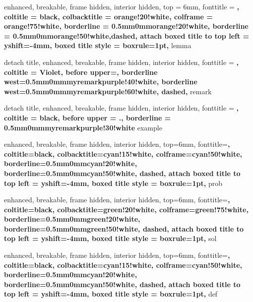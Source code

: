 {%
	enhanced,
	breakable,
	frame hidden,
	interior hidden,
	top = 6mm,
	fonttitle = \bfseries,
	coltitle = black,
	colbacktitle = orange!20!white,
	colframe = orange!75!white,
	borderline = {0.5mm}{0mm}{orange!20!white},
	borderline = {0.5mm}{0mm}{orange!50!white,dashed},
	attach boxed title to top left = {yshift=-4mm},
	boxed title style = {boxrule=1pt},
}{lemma}

{%
	detach title,
	enhanced,
	breakable,
	frame hidden,
	interior hidden,
	fonttitle = \bfseries,
	coltitle = Violet,
	before upper={\tcbtitle\quad},
	borderline west={0.5mm}{0mm}{myremarkpurple!40!white},
	borderline west={0.5mm}{0mm}{myremarkpurple!60!white, dashed},
}{remark}

%
{%
	detach title,
	enhanced,
	breakable,
	frame hidden,
	interior hidden,
	fonttitle = \bfseries,
	coltitle = black,
	before upper = {\tcbtitle.\quad},
	borderline = {0.5mm}{0mm}{myremarkpurple!30!white}
}{example}

\renewenvironment{proof}[1][\proofname]{\textbf{\textit{#1.}}}{\qed}

{%
	enhanced,
	breakable,
	frame hidden,
	interior hidden,
	top=6mm,
	fonttitle=\bfseries,
	coltitle=black,
	colbacktitle=cyan!15!white,
	colframe=cyan!50!white,
	borderline={0.5mm}{0mm}{cyan!20!white},
	borderline={0.5mm}{0mm}{cyan!50!white, dashed},
	attach boxed title to top left = {yshift=-4mm},
	boxed title style = {boxrule=1pt},
}{prob}
\makeatletter
\newcommand\tcb@cnt@problemautorefname{Problem}
\makeatother

{%
	enhanced,
	breakable,
	frame hidden,
	interior hidden,
	top=6mm,
	fonttitle=\bfseries,
	coltitle=black,
	colbacktitle=green!20!white,
	colframe=green!75!white,
	borderline={0.5mm}{0mm}{green!20!white},
	borderline={0.5mm}{0mm}{green!50!white, dashed},
	attach boxed title to top left = {yshift=-4mm},
	boxed title style = {boxrule=1pt},
}{sol}

{%
	enhanced,
	breakable,
	frame hidden,
	interior hidden,
	top=6mm,
	fonttitle=\bfseries,
	coltitle=black,
	colbacktitle=cyan!15!white,
	colframe=cyan!50!white,
	borderline={0.5mm}{0mm}{cyan!20!white},
	borderline={0.5mm}{0mm}{cyan!50!white, dashed},
	attach boxed title to top left = {yshift=-4mm},
	boxed title style = {boxrule=1pt},
}{def}

